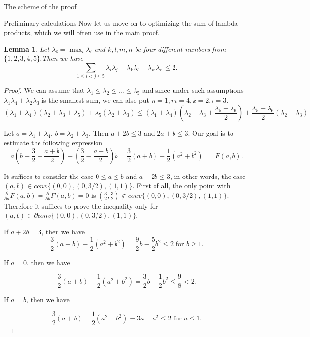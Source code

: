 \documentclass[12pt]{article}
\newtheorem{lemma}{Lemma}[section]
\begin{document}
\begin{section}{The scheme of the proof}
\begin{section}{Preliminary calculations}
    Now let us move on to optimizing the sum of lambda products, which we will often use in the main proof. 
    
   
    \begin{lemma}
    \label{lemma-2}
        Let $\lambda_{6} = \max_{i}\lambda_{i}$ and $k,l,m,n$ be four different  numbers from $\{1,2,3,4,5\}$.Then we have 
        $$
            \sum_{1\leq i<j\leq 5}\lambda_{i}\lambda_{j} - \lambda_{k}\lambda_{l} - \lambda_{m}\lambda_{n}\leq 2.
        $$
    \end{lemma}
    
    \begin{proof}
        We can assume that $\lambda_{1}\leq \lambda_{2}\leq \ldots \leq \lambda_{5}$ and since under such  assumptions $\lambda_{1}\lambda_{4} + \lambda_{2}\lambda_{3}$ is the smallest sum, we can also put $n=1,m=4,k=2,l=3$. 
         $$
            (\lambda_{1} + \lambda_{4})(\lambda_{2}+\lambda_{3} + \lambda_{5}) + \lambda_{5}(\lambda_{2} + \lambda_{3}) \leq (\lambda_{1} + \lambda_{4})\left(\lambda_{2}+\lambda_{3} + \frac{\lambda_{5}+\lambda_{6}}{2}\right) + \frac{\lambda_{5}+\lambda_{6}}{2}(\lambda_{2} + \lambda_{3})  
    $$

    Let $a = \lambda_{1} + \lambda_{4}$, $b = \lambda_{2} + \lambda_{3}$. Then $a+2b\leq 3$ and $2a+b\leq 3$. Our goal is to estimate the following expression
    $$
        a\left(b+\frac{3}{2} - \frac{a+b}{2}\right) + \left(\frac{3}{2} - \frac{a+b}{2}\right)b = \frac{3}{2}(a+b) - \frac{1}{2}(a^{2}+b^{2}) =: F(a,b).
    $$

    It suffices to consider the case $0\leq a\leq b$ and $a+2b \leq 3$, in other words, the case $(a,b) \in conv\{(0,0),(0,3/2), (1,1)\}$. First of all, the only point with $\frac{\partial}{\partial a}F(a,b) = \frac{\partial}{\partial b}F(a,b) = 0$ is $(\frac{3}{2},\frac{3}{2}) \not\in conv\{(0,0),(0,3/2), (1,1)\}$. Therefore it suffices to prove the inequality only for $(a,b) \in \partial conv\{(0,0),(0,3/2), (1,1)\}.$ 
    
     If $a+2b=3$, then we have 
    $$
        \frac{3}{2}(a+b) - \frac{1}{2}(a^{2}+b^{2}) = \frac{9}{2}b - \frac{5}{2}b^2\leq 2 \text{ for $b\geq 1$.}
    $$
    
    If $a=0$, then we have 

     $$
        \frac{3}{2}(a+b) - \frac{1}{2}(a^{2}+b^{2}) = \frac{3}{2}b - \frac{1}{2}b^2 \leq \frac{9}{8}<2.
    $$
    
    If $a=b$, then we have 

     $$
        \frac{3}{2}(a+b) - \frac{1}{2}(a^{2}+b^{2}) = 3a - a^2 \leq 2 \text{ for $a\leq 1$.}
    $$
    \end{proof}
    

\end{section}
\end{section}
\end{document}
